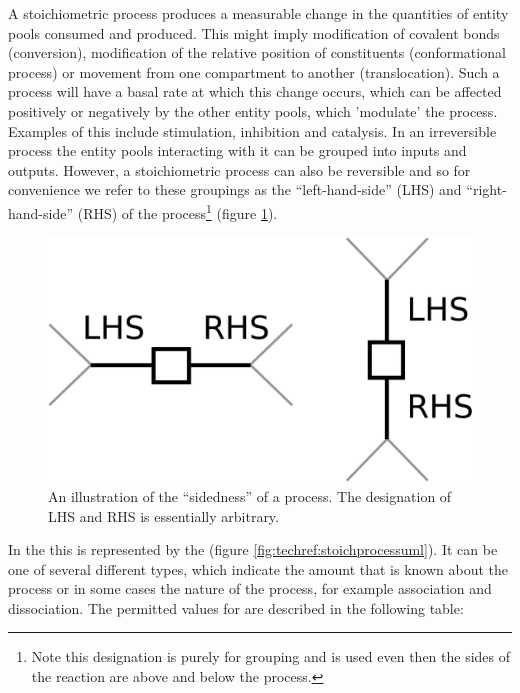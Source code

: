 A stoichiometric process produces a measurable change in the
quantities of entity pools consumed and produced. This might imply
modification of covalent bonds (conversion), modification of the
relative position of constituents (conformational process) or movement
from one compartment to another (translocation). Such a process will
have a basal rate at which this change occurs, which can be affected
positively or negatively by the other entity pools, which 'modulate'
the process. Examples of this include stimulation, inhibition and
catalysis. In an irreversible process the entity pools interacting
with it can be grouped into inputs and outputs. However, a
stoichiometric process can also be reversible and so for convenience
we refer to these groupings as the ``left-hand-side'' (LHS) and
``right-hand-side'' (RHS) of the process\footnote{Note this
  designation is purely for grouping and is used even then the sides
  of the reaction are above and below the process.}  (figure
\ref{fig:techref:process-sidedness}).

\begin{figure}[htb]
  \centering
  \includegraphics[scale = 0.4]{images/process_sidedness}
  \caption{An illustration of the ``sidedness'' of a process. The designation of LHS and RHS is essentially arbitrary.}
  \label{fig:techref:process-sidedness}
\end{figure}

In the \PDl this is represented by the
 (figure \ref{fig:techref:stoichprocessuml}). It
can be one of several different types, which indicate the amount that
is known about the process or in some cases the nature of the process,
for example association and dissociation. The permitted values for
 are described in the following table:

